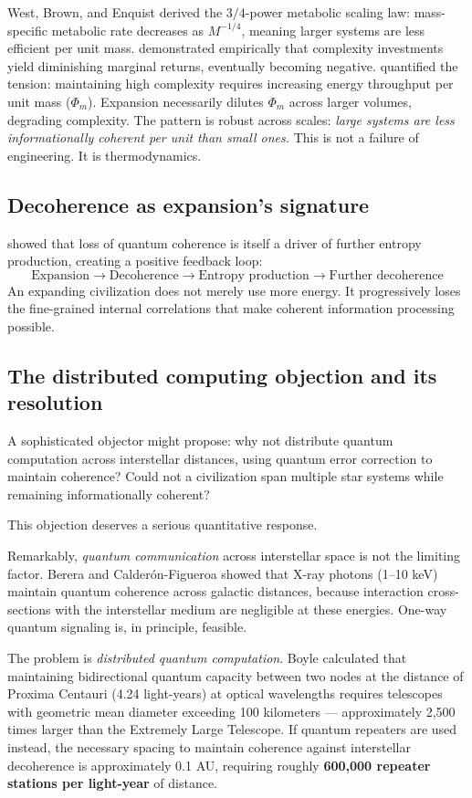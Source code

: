 \documentclass[12pt, a4paper]{article}
\begin{document}
West, Brown, and Enquist \citep{west1997} derived the $3/4$-power metabolic scaling law:
mass-specific metabolic rate decreases as $M^{-1/4}$, meaning larger systems are less
efficient per unit mass. \citet{tainter1988} demonstrated empirically that complexity
investments yield diminishing marginal returns, eventually becoming negative. \citet{chaisson2011}
quantified the tension: maintaining high complexity requires increasing energy throughput per
unit mass ($\Phi_m$). Expansion necessarily dilutes $\Phi_m$ across larger volumes, degrading
complexity. The pattern is robust across scales: \textit{large systems are less informationally
coherent per unit than small ones.} This is not a failure of engineering. It is
thermodynamics.

\subsection{Decoherence as expansion's signature}

\citet{santos2019} showed that loss of quantum coherence is itself a driver of further
entropy production, creating a positive feedback loop:
\[
\text{Expansion} \to \text{Decoherence} \to \text{Entropy production} \to
\text{Further decoherence}
\]
An expanding civilization does not merely use more energy. It progressively loses the
fine-grained internal correlations that make coherent information processing possible.

\subsection{The distributed computing objection and its resolution}

A sophisticated objector might propose: why not distribute quantum computation across
interstellar distances, using quantum error correction to maintain coherence? Could not a
civilization span multiple star systems while remaining informationally coherent?

This objection deserves a serious quantitative response.

Remarkably, \textit{quantum communication} across interstellar space is not the limiting
factor. Berera and Calder\'{o}n-Figueroa \citep{berera2022} showed that X-ray photons
(1--10 keV) maintain quantum coherence across galactic distances, because interaction
cross-sections with the interstellar medium are negligible at these energies. One-way quantum
signaling is, in principle, feasible.

The problem is \textit{distributed quantum computation}. Boyle \citep{boyle2024} calculated
that maintaining bidirectional quantum capacity between two nodes at the distance of Proxima
Centauri (4.24 light-years) at optical wavelengths requires telescopes with geometric mean
diameter exceeding 100 kilometers --- approximately 2,500 times larger than the Extremely
Large Telescope. If quantum repeaters are used instead, the necessary spacing to maintain
coherence against interstellar decoherence is approximately 0.1 AU, requiring roughly
\textbf{600,000 repeater stations per light-year} of distance.
\end{document}
